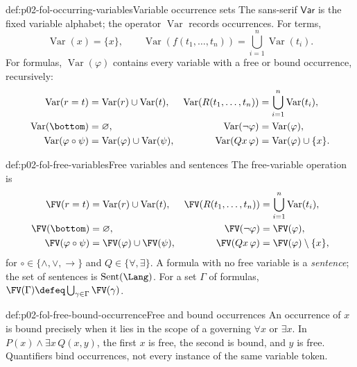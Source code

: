 \begin{hbdefinition}{def:p02-fol-occurring-variables}{Variable occurrence sets}
The sans-serif \(\mathsf{Var}\) is the fixed variable alphabet; the operator
\(\operatorname{Var}\) records occurrences.  For terms,
\[
 \operatorname{Var}(x)=\{x\},\qquad
 \operatorname{Var}(f(t_1,\ldots,t_n))
   =\bigcup_{i=1}^{n}\operatorname{Var}(t_i).
\]
For formulas, \(\operatorname{Var}(\varphi)\) contains every variable with a
free or bound occurrence, recursively:
\[
\begin{aligned}
 \operatorname{Var}(r=t)&=\operatorname{Var}(r)\cup\operatorname{Var}(t),&
 \operatorname{Var}(R(t_1,\ldots,t_n))&=\bigcup_{i=1}^n\operatorname{Var}(t_i),\\
 \operatorname{Var}(\bottom)&=\varnothing,&
 \operatorname{Var}(\neg\varphi)&=\operatorname{Var}(\varphi),\\
 \operatorname{Var}(\varphi\circ\psi)&=\operatorname{Var}(\varphi)\cup
 \operatorname{Var}(\psi),&
 \operatorname{Var}(Qx\,\varphi)&=\operatorname{Var}(\varphi)\cup\{x\}.
\end{aligned}
\]
\end{hbdefinition}

\begin{hbdefinition}{def:p02-fol-free-variables}{Free variables and sentences}
The free-variable operation is
\[
\begin{aligned}
 \FV(r=t)&=\operatorname{Var}(r)\cup\operatorname{Var}(t),&
 \FV(R(t_1,\ldots,t_n))&=\bigcup_{i=1}^n\operatorname{Var}(t_i),\\
 \FV(\bottom)&=\varnothing,&
 \FV(\neg\varphi)&=\FV(\varphi),\\
 \FV(\varphi\circ\psi)&=\FV(\varphi)\cup\FV(\psi),&
 \FV(Qx\,\varphi)&=\FV(\varphi)\setminus\{x\},
\end{aligned}
\]
for \(\circ\in\{\land,\lor,\to\}\) and
\(Q\in\{\forall,\exists\}\).  A formula with no free variable is a
\emph{sentence}; the set of sentences is
\(\operatorname{Sent}(\Lang)\).  For a set \(\Gamma\) of formulas,
\(\FV(\Gamma)\defeq\bigcup_{\gamma\in\Gamma}\FV(\gamma)\).
\end{hbdefinition}

\begin{hbexample}{def:p02-fol-free-bound-occurrence}{Free and bound occurrences}
An occurrence of \(x\) is bound precisely when it lies in the scope of a
governing \(\forall x\) or \(\exists x\).  In
\(P(x)\land\exists x\,Q(x,y)\), the first \(x\) is free, the second is
bound, and \(y\) is free.  Quantifiers bind occurrences, not every instance
of the same variable token.
\end{hbexample}


